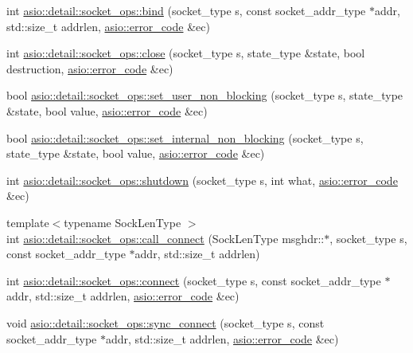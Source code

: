 \begin{DoxyCompactItemize}
\item 
int \hyperlink{namespaceasio_1_1detail_1_1socket__ops_a86014a1273549d66157c6e4dd9532f86}{asio\+::detail\+::socket\+\_\+ops\+::bind} (socket\+\_\+type s, const socket\+\_\+addr\+\_\+type $\ast$addr, std\+::size\+\_\+t addrlen, \hyperlink{classasio_1_1error__code}{asio\+::error\+\_\+code} \&ec)
\item 
int \hyperlink{namespaceasio_1_1detail_1_1socket__ops_a4760d49c99fce56c04fb8802987d0c44}{asio\+::detail\+::socket\+\_\+ops\+::close} (socket\+\_\+type s, state\+\_\+type \&state, bool destruction, \hyperlink{classasio_1_1error__code}{asio\+::error\+\_\+code} \&ec)
\item 
bool \hyperlink{namespaceasio_1_1detail_1_1socket__ops_ac72e73a316330cf59e40d4b0a1816fae}{asio\+::detail\+::socket\+\_\+ops\+::set\+\_\+user\+\_\+non\+\_\+blocking} (socket\+\_\+type s, state\+\_\+type \&state, bool value, \hyperlink{classasio_1_1error__code}{asio\+::error\+\_\+code} \&ec)
\item 
bool \hyperlink{namespaceasio_1_1detail_1_1socket__ops_a38ae624d853beaee58adc2c46d86054e}{asio\+::detail\+::socket\+\_\+ops\+::set\+\_\+internal\+\_\+non\+\_\+blocking} (socket\+\_\+type s, state\+\_\+type \&state, bool value, \hyperlink{classasio_1_1error__code}{asio\+::error\+\_\+code} \&ec)
\item 
int \hyperlink{namespaceasio_1_1detail_1_1socket__ops_a52f4bb543e335864660c9ea062c793c5}{asio\+::detail\+::socket\+\_\+ops\+::shutdown} (socket\+\_\+type s, int what, \hyperlink{classasio_1_1error__code}{asio\+::error\+\_\+code} \&ec)
\item 
{\footnotesize template$<$typename Sock\+Len\+Type $>$ }\\int \hyperlink{namespaceasio_1_1detail_1_1socket__ops_a7ad2e5ff21f72942315721737b2a9f86}{asio\+::detail\+::socket\+\_\+ops\+::call\+\_\+connect} (Sock\+Len\+Type msghdr\+::$\ast$, socket\+\_\+type s, const socket\+\_\+addr\+\_\+type $\ast$addr, std\+::size\+\_\+t addrlen)
\item 
int \hyperlink{namespaceasio_1_1detail_1_1socket__ops_a7ecc6977534593ecb57fa31503300524}{asio\+::detail\+::socket\+\_\+ops\+::connect} (socket\+\_\+type s, const socket\+\_\+addr\+\_\+type $\ast$addr, std\+::size\+\_\+t addrlen, \hyperlink{classasio_1_1error__code}{asio\+::error\+\_\+code} \&ec)
\item 
void \hyperlink{namespaceasio_1_1detail_1_1socket__ops_a78f17afc95370e9de0db689b33108a5c}{asio\+::detail\+::socket\+\_\+ops\+::sync\+\_\+connect} (socket\+\_\+type s, const socket\+\_\+addr\+\_\+type $\ast$addr, std\+::size\+\_\+t addrlen, \hyperlink{classasio_1_1error__code}{asio\+::error\+\_\+code} \&ec)

\end{DoxyCompactItemize}
